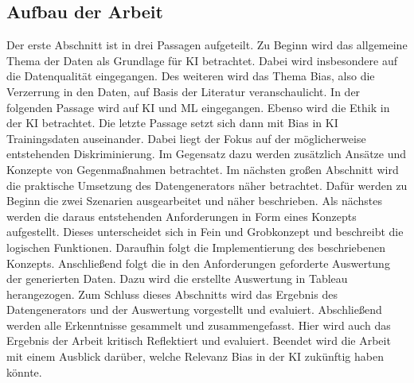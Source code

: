 \begin{onehalfspace}
    \newpage
    \section{Aufbau der Arbeit}
    \label{subsec:aufbau der arbeit}
        Der erste Abschnitt ist in drei Passagen aufgeteilt. Zu Beginn wird das allgemeine Thema der Daten als Grundlage für \ac*{KI} betrachtet. Dabei wird insbesondere auf die Datenqualität eingegangen. Des weiteren wird das Thema Bias, also die Verzerrung in den Daten, auf Basis der Literatur veranschaulicht. In der folgenden Passage wird auf \ac*{KI} und \ac*{ML} eingegangen. Ebenso wird die Ethik in der \ac*{KI} betrachtet. Die letzte Passage setzt sich dann mit Bias in \ac*{KI} Trainingsdaten auseinander. Dabei liegt der Fokus auf der möglicherweise entstehenden Diskriminierung. Im Gegensatz dazu werden zusätzlich Ansätze und Konzepte von Gegenmaßnahmen betrachtet.
        Im nächsten großen Abschnitt wird die praktische Umsetzung des Datengenerators näher betrachtet. Dafür werden zu Beginn die zwei Szenarien ausgearbeitet und näher beschrieben. Als nächstes werden die daraus entstehenden Anforderungen in Form eines Konzepts aufgestellt. Dieses unterscheidet sich in Fein und Grobkonzept und beschreibt die logischen Funktionen. Daraufhin folgt die Implementierung des beschriebenen Konzepts. Anschließend folgt die in den Anforderungen geforderte Auswertung der generierten Daten. Dazu wird die erstellte Auswertung in Tableau herangezogen. Zum Schluss dieses Abschnitts wird das Ergebnis des Datengenerators und der Auswertung vorgestellt und evaluiert.
        Abschließend werden alle Erkenntnisse gesammelt und zusammengefasst. Hier wird auch das Ergebnis der Arbeit kritisch Reflektiert und evaluiert. Beendet wird die Arbeit mit einem Ausblick darüber, welche Relevanz Bias in der \ac*{KI} zukünftig haben könnte. 
    
    \newpage
\end{onehalfspace}